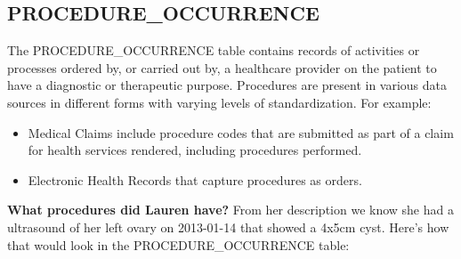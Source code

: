 \documentclass[11pt]{book}
\providecommand{\tightlist}{%
  \setlength{\itemsep}{0pt}\setlength{\parskip}{0pt}}
\theoremstyle{definition}
\theoremstyle{definition}
\theoremstyle{definition}
\theoremstyle{remark}
\begin{document}
\hypertarget{procedureOccurrence}{%
\subsection{PROCEDURE\_OCCURRENCE}\label{procedureOccurrence}}

The PROCEDURE\_OCCURRENCE table contains records of activities or processes ordered by, or carried out by, a healthcare provider on the patient to have a diagnostic or therapeutic purpose. Procedures are present in various data sources in different forms with varying levels of standardization. For example:

\begin{itemize}
\tightlist
\item
  Medical Claims include procedure codes that are submitted as part of a claim for health services rendered, including procedures performed.
\item
  Electronic Health Records that capture procedures as orders.
\end{itemize}

\textbf{What procedures did Lauren have?}
From her description we know she had a ultrasound of her left ovary on 2013-01-14 that showed a 4x5cm cyst. Here's how that would look in the PROCEDURE\_OCCURRENCE table:
\end{document}
